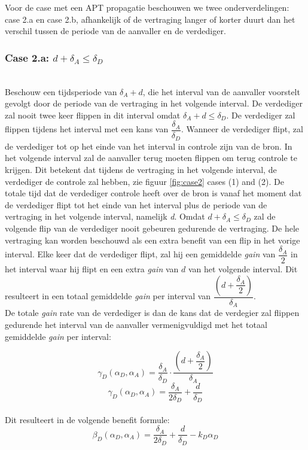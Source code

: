 \documentclass[master=cws, masteroption=vs,english]{kulemt}
\begin{document}
\begin{abstract*}
Voor de case met een APT propagatie beschouwen we twee onderverdelingen: case 2.a en case 2.b, afhankelijk of de vertraging langer of korter duurt dan het verschil tussen de periode van de aanvaller en de verdediger.\\


\subsubsection*{\textbf{Case 2.a:} $d + \delta_{A} \leq \delta_{D}$}
~~\\
Beschouw een tijdsperiode van $\delta_{A} + d$, die het interval van de aanvaller voorstelt gevolgt door de periode van de vertraging in het volgende interval. De verdediger zal nooit twee keer flippen in dit interval omdat  $\delta_{A} + d \leq \delta_{D}$. De verdediger zal flippen tijdens het interval met een kans van $\dfrac{\delta_{A}}{\delta_{D}} $. Wanneer de verdediger flipt, zal de verdediger tot op het einde van het interval in controle zijn van de bron. In het volgende interval zal de aanvaller terug moeten flippen om terug controle te krijgen. Dit betekent dat tijdens de vertraging in het volgende interval, de verdediger de controle zal hebben, zie figuur  \ref{fig:case2} cases (1) and (2). De totale tijd dat de verdediger controle heeft over de bron is vanaf het moment dat de verdediger flipt tot het einde van het interval plus de periode van de vertraging in het volgende interval, namelijk \textit{d}. Omdat $d + \delta_{A} \leq \delta_{D}$  zal de volgende flip van de verdediger nooit gebeuren gedurende de vertraging. De hele vertraging kan worden beschouwd als een extra benefit van een flip in het vorige interval.
Elke keer dat de verdediger flipt, zal hij een gemiddelde \textit{gain} van $\dfrac{\delta_{A}}{2}$ in het interval waar hij flipt en een extra \textit{gain} van $d$ van het volgende interval. Dit resulteert in een totaal gemiddelde \textit{gain} per interval van
$\dfrac{(d+\dfrac{\delta_{A}}{2})}{\delta_{A}}$. \\

De totale \textit{gain} rate van de verdediger is dan de kans dat de verdegier zal flippen gedurende het interval van de aanvaller vermenigvuldigd met het totaal gemiddelde \textit{gain} per interval:


\begin{equation}\label{first}
\gamma_{D}(\alpha_{D},\alpha_{A}) = \dfrac{\delta_{A}}{\delta_{D}} \cdot \dfrac{(d+\dfrac{\delta_{A}}{2})}{\delta_{A}} 
\end{equation}
\begin{equation}\label{first}
\gamma_{D}(\alpha_{D},\alpha_{A}) = \dfrac{\delta_{A}}{2\delta_{D}} + \dfrac{d}{\delta_{D}} 
\end{equation}\\
Dit resulteert in de volgende benefit formule:
\begin{equation}\label{first}
\beta_{D}(\alpha_{D},\alpha_{A}) = \dfrac{\delta_{A}}{2\delta_{D}} + \dfrac{d}{\delta_{D}} - k_{D} \alpha_{D} 
\end{equation}\\


\end{abstract*}
\end{document}
